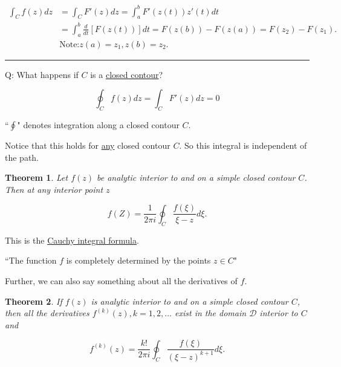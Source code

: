 \documentclass[twoside]{article}
\newcounter{lecnum}
\newtheorem{theorem}{Theorem}[lecnum]
\newenvironment{proof}{{\bf Proof:}}{\hfill\rule{2mm}{2mm}}
\begin{document}
\begin{proof}
	\begin{equation}
		\begin{split}
			\int_C f(z)dz&=\int_C F'(z)dz=\int^b_a F'(z(t))z'(t)dt\\
			&=\int^b_a \frac{d}{dt}[F(z(t))]dt= F(z(b))-F(z(a))=F(z_2)-F(z_1).\\
			&\text{Note:} z(a)=z_1, z(b)=z_2.
		\end{split}
	\end{equation}
\end{proof}

Q: What happens if $C$ is a \underline{closed contour}?

$$\oint_C f(z)dz = \int_C F'(z)dz=0$$

``$\oint$" denotes integration along a closed contour $C$.

Notice that this holds for \underline{any} closed contour $C$. So this integral is independent of the path.\\

\begin{theorem}
	Let $f(z)$ be analytic interior to and on a simple closed contour $C$. Then at any interior point $z$
	
	$$f(Z)=\frac{1}{2\pi i}\oint_C\frac{f(\xi)}{\xi -z}d\xi.$$
\end{theorem}

This is the \underline{Cauchy integral formula}.

``The function $f$ is completely determined by the points $z\in C$"

Further, we can also say something about all the derivatives of $f$.\\

\begin{theorem}
	If $f(z)$ is analytic interior to and on a simple closed contour $C$, then all the derivatives $f^{(k)}(z), k=1,2,\dots$ exist in the domain $\mathcal{D}$ interior to $C$ and
	
	$$f^{(k)}(z)=\frac{k!}{2\pi i}\oint_C\frac{f(\xi)}{(\xi-z)^{k+1}}d\xi.$$
	
	
\end{theorem}

\end{document}
